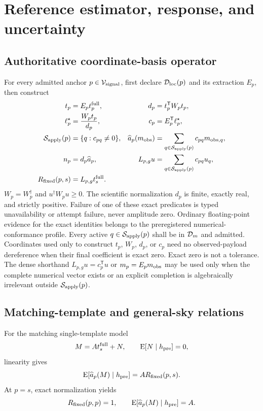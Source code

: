 \section{Reference estimator, response, and uncertainty}
\label{sec:equations}

\subsection{Authoritative coordinate-basis operator}

For every admitted anchor $p\in\mathcal{V}_{\rm signal}$, first declare
$\mathcal{D}_{\rm loc}(p)$ and its extraction $E_p$, then construct
\begin{align}
 t_p &= E_pt_p^{\rm full}, &
 d_p &= t_p^{\mathsf T}W_pt_p, \\
 \ell_p^\star &= \frac{W_pt_p}{d_p}, &
 c_p &= E_p^{\mathsf T}\ell_p^\star, \\
 \mathcal{S}_{\rm apply}(p)&=\{q:c_{pq}\ne0\}, &
 \widehat a_p(m_{\rm obs})&=\sum_{q\in\mathcal{S}_{\rm apply}(p)}c_{pq}m_{{\rm obs},q}, \\
 n_p&=d_p\widehat a_p, &
 L_{p,g}u&=\sum_{q\in\mathcal{S}_{\rm apply}(p)}c_{pq}u_q, \\
 R_{\rm fixed}(p,s) &= L_{p,g}t_s^{\rm full}. &&
\end{align}
$W_p=W_p^{\dagger}$ and $u^{\dagger}W_pu\geq0$. The scientific
normalization $d_p$ is finite, exactly real, and strictly positive. Failure of
one of these exact predicates is typed unavailability or attempt failure,
never amplitude zero. Ordinary floating-point evidence for the exact
identities belongs to the preregistered numerical-conformance profile.
Every active $q\in\mathcal{S}_{\rm apply}(p)$ shall be in $\mathcal{D}_m$ and admitted.
Coordinates used only to construct $t_p$, $W_p$, $d_p$, or $c_p$ need no
observed-payload dereference when their final coefficient is exact zero. Exact
zero is not a tolerance. The dense shorthand $L_{p,g}u=c_p^{\mathsf T}u$ or
$m_p=E_pm_{\rm obs}$ may be used only when the
complete numerical vector exists or an explicit completion is algebraically
irrelevant outside $\mathcal{S}_{\rm apply}(p)$.

\subsection{Matching-template and general-sky relations}

For the matching single-template model
\[
 M=A t_s^{\rm full}+N,
 \qquad \operatorname E[N\mid h_{\rm pre}]=0,
\]
linearity gives
\[
 \operatorname E[\widehat a_p(M)\mid h_{\rm pre}]=A R_{\rm fixed}(p,s).
\]
At $p=s$, exact normalization yields
\[
 R_{\rm fixed}(p,p)=1,
 \qquad \operatorname E[\widehat a_p(M)\mid h_{\rm pre}]=A.
\]

